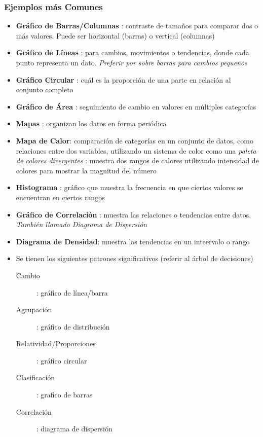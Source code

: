 \subsubsection{Ejemplos más Comunes}
\begin{itemize}
    \item {\textbf{Gráfico de Barras/Columnas} : contraste de tamaños para comparar dos o más valores. Puede ser horizontal (barras) o vertical (columnas)}
    \item {\textbf{Gráfico de Líneas} : para cambios, movimientos o tendencias, donde cada punto representa un dato. \textit{Preferir por sobre barras para cambios pequeños}}
    \item {\textbf{Gráfico Circular} : cuál es la proporción de una parte en relación al conjunto completo}
    \item {\textbf{Gráfico de Área} : seguimiento de cambio en valores en múltiples categorías}
    \item {\textbf{Mapas} : organizan los datos en forma periódica}
    \item {\textbf{Mapa de Calor}: comparación de categorías en un conjunto de datos, como relaciones entre dos variables, utilizando un sistema de color como una \textit{paleta de colores divergentes} : muestra dos rangos de calores utilizando intensidad de colores para mostrar la magnitud del número}
    \item {\textbf{Histograma} : gráfico que muestra la frecuencia en que ciertos valores se encuentran en ciertos rangos}
    \item {\textbf{Gráfico de Correlación} : muestra las relaciones o tendencias entre datos. \textit{También llamado Diagrama de Dispersión}}
    \item {\textbf{Diagrama de Densidad}: muestra las tendencias en un inteervalo o rango}
    \item {Se tienen los siguientes patrones significativos (referir al árbol de decisiones)
    \begin{description}
        \item [Cambio]{ : gráfico de línea/barra}
        \item [Agrupación]{ : gráfico de distribución}
        \item [Relatividad/Proporciones]{ : gráfico circular}
        \item [Clasificación]{ : grafico de barras}
        \item [Correlación]{ : diagrama de dispersión}
    \end{description}}
\end{itemize}

